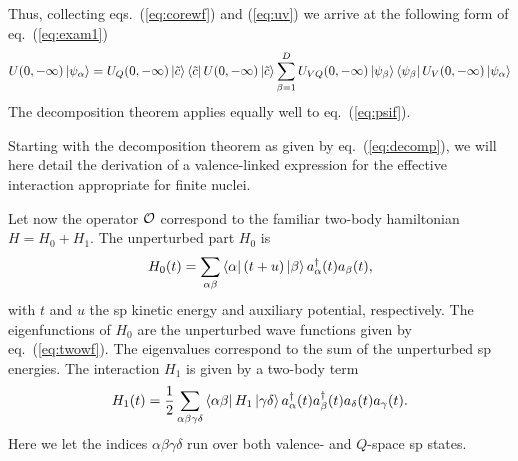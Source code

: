 Thus, collecting eqs.\ (\ref{eq:corewf}) and (\ref{eq:uv}) we arrive at
the following form of eq.\ (\ref{eq:exam1})
\begin{equation}
     U(0,-\infty )\left| \psi_{\alpha} \right\rangle =
     U_Q(0,-\infty )\left| \tilde{c} \right\rangle\left\langle \tilde{c} \right|
     U(0,-\infty )\left| \tilde{c} \right\rangle
     {\displaystyle \sum_{\beta=1}^{D}
     U_{VQ}(0,-\infty )\left| \psi_{\beta} \right\rangle\left\langle \psi_{\beta} \right|
     U_V(0,-\infty )\left| \psi_{\alpha} \right\rangle}
\label{eq:decomp}
\end{equation}
The decomposition theorem applies equally well to eq.\ (\ref{eq:psif}).


Starting with the decomposition theorem as given by 
eq.\ (\ref{eq:decomp}), we will here
detail the derivation of a valence-linked expression
for the effective interaction appropriate for finite nuclei. 



Let now the operator ${\cal O}$ correspond to the
familiar two-body hamiltonian $H=H_0 +H_1$. The unperturbed
part $H_0$ is
\begin{equation}
       H_0(t) ={\displaystyle \sum_{\alpha\beta}\left\langle \alpha \right|(t+u)\left| \beta \right\rangle
		       a_{\alpha}^{\dagger}(t)a_{\beta}(t)},
    \label{eq:unpert}
\end{equation}
with $t$ and $u$ the sp kinetic energy and auxiliary potential, 
respectively. The eigenfunctions of $H_0$ are the unperturbed
wave 
functions given by eq.\ (\ref{eq:twowf}).
The eigenvalues
correspond to the sum of the unperturbed sp energies. The interaction
$H_1$ is given by a two-body term
\begin{equation}
H_1(t) = {\displaystyle \frac{1}{2}
	   \sum_{\alpha\beta\gamma\delta}\left\langle \alpha\beta \right|H_1
	   \left| \gamma\delta \right\rangle a_{\alpha}^{\dagger}(t)
	   a_{\beta}^{\dagger}(t)
	   a_{\delta}(t)a_{\gamma}(t)}.
     \label{eq:inter}
\end{equation}
Here we let the indices $\alpha\beta\gamma\delta$ run over both valence-
and $Q$-space sp states.

